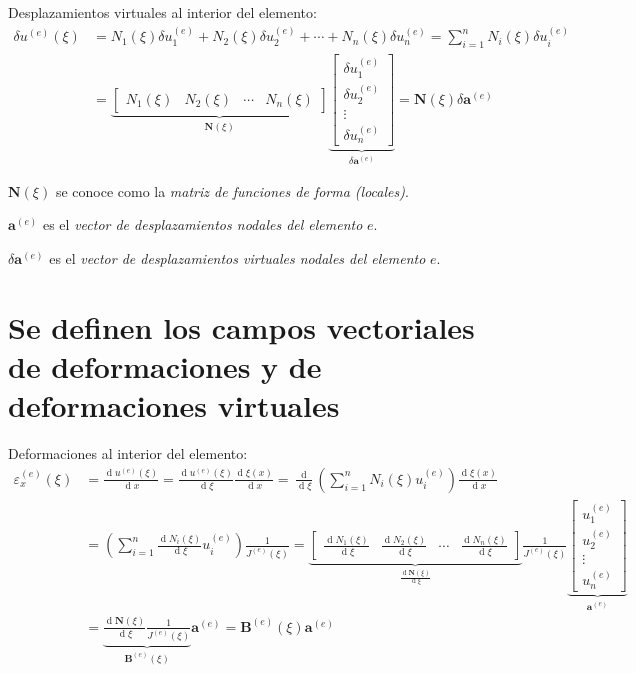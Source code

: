 \documentclass[12pt,letterpaper]{article}
\newcommand{\ve}[1]{{\boldsymbol{#1}}}
\newcommand{\ma}[1]{{\boldsymbol{#1}}}
\newcommand{\dd}{\operatorname{d} \!}
\begin{document}
Desplazamientos virtuales al interior del elemento:
\begin{align}
\delta u^{(e)}(\xi) 
&= N_1(\xi) \delta u_1^{(e)} + N_2(\xi) \delta u_2^{(e)} + \cdots + N_n(\xi) \delta u_n^{(e)} = \sum_{i=1}^n N_i(\xi) \delta u_i^{(e)} \\
&= 
\underbrace{\begin{bmatrix}
   N_1(\xi) & N_2(\xi) & \cdots & N_n(\xi)
   \end{bmatrix}}_{\ma{N}(\xi)}
\underbrace{\begin{bmatrix}
   \delta u_1^{(e)} \\ \delta u_2^{(e)} \\ \vdots \\ \delta u_n^{(e)} 
   \end{bmatrix}}_{\delta \ma{a}^{(e)}} = \ma{N}(\xi) \delta \ve{a}^{(e)}
\end{align}

$\ma{N}(\xi)$ se conoce como la \emph{matriz de funciones de forma (locales)}.

$\ve{a}^{(e)}$ es el \emph{vector de desplazamientos nodales del elemento} $e$.

$\delta\ve{a}^{(e)}$ es el \emph{vector de desplazamientos virtuales nodales del elemento} $e$.

\newpage

\section{Se definen los campos vectoriales de deformaciones y  de deformaciones virtuales}

Deformaciones al interior del elemento:
\begin{align}
\varepsilon_x^{(e)}(\xi) &= \frac{\dd u^{(e)}(\xi)}{\dd x} =
 \frac{\dd u^{(e)}(\xi)}{\dd \xi}\frac{\dd \xi(x)}{\dd x} = \frac{\dd}{\dd \xi}\left(\sum_{i=1}^n N_i(\xi) u_i^{(e)}\right)\frac{\dd \xi(x)}{\dd x} \\
 &= \left(\sum_{i=1}^n \frac{\dd N_i(\xi)}{\dd \xi} u_i^{(e)}\right) \frac{1}{J^{(e)}(\xi)} = 
\underbrace{\begin{bmatrix}
  \frac{\dd N_1(\xi)}{\dd \xi} & \frac{\dd N_2(\xi)}{\dd \xi} & \cdots & \frac{\dd N_n(\xi)}{\dd \xi}
   \end{bmatrix}}_{\frac{\dd \ma{N}(\xi)}{\dd \xi}} \frac{1}{J^{(e)}(\xi)}
\underbrace{\begin{bmatrix}
   u_1^{(e)} \\ u_2^{(e)} \\ \vdots \\ u_n^{(e)}
   \end{bmatrix}}_{\ma{a}^{(e)}} \\
&= 
\underbrace{\frac{\dd \ma{N}(\xi)}{\dd \xi}%
    \frac{1}{J^{(e)}(\xi)}}_{\ma{B}^{(e)}(\xi)}
\ma{a}^{(e)} = \ma{B}^{(e)}(\xi)  \ve{a}^{(e)}
\end{align}
\end{document}
